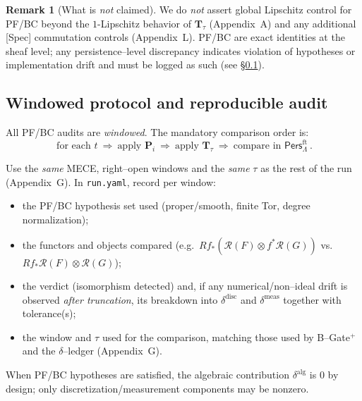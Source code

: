 \documentclass[11pt]{article}
\numberwithin{equation}{section}
\theoremstyle{plain}
\theoremstyle{definition}
\theoremstyle{remark}
\newcommand{\Pers}{\mathsf{Pers}}
\theoremstyle{plain}
\theoremstyle{definition}
\numberwithin{equation}{section}
\theoremstyle{definition}
\newtheorem{remark}[theorem]{Remark}
\numberwithin{equation}{section}
\theoremstyle{plain}
\theoremstyle{definition}
\theoremstyle{remark}
\begin{document}
\begin{remark}[What is \emph{not} claimed]
We do \emph{not} assert global Lipschitz control for PF/BC beyond the \(1\)\nobreakdash-Lipschitz behavior of \(\mathbf{T}_\tau\) (Appendix~A) and any additional [Spec] commutation controls (Appendix~L). PF/BC are exact identities at the sheaf level; any persistence--level discrepancy indicates violation of hypotheses or implementation drift and must be logged as such (see \S\ref{N:window-protocol}).
\end{remark}

\subsection{Windowed protocol and reproducible audit}
\label{N:window-protocol}
All PF/BC audits are \emph{windowed}. The mandatory comparison order is:
\[
\boxed{\ \text{for each } t\ \Longrightarrow\ \text{apply } \mathbf{P}_i\ \Longrightarrow\ \text{apply } \mathbf{T}_\tau\ \Longrightarrow\ \text{compare in }\Pers^{\mathrm{ft}}_\Lambda\ }.
\]

Use the \emph{same} MECE, right–open windows and the \emph{same} \(\tau\) as the rest of the run (Appendix~G). In \texttt{run.yaml}, record per window:
\begin{itemize}\itemsep0.25em
  \item the PF/BC hypothesis set used (proper/smooth, finite Tor, degree normalization);
  \item the functors and objects compared (e.g.\ \(Rf_\ast(\mathcal{R}(F)\otimes f^\ast\mathcal{R}(G))\) vs.\ \(Rf_\ast\mathcal{R}(F)\otimes\mathcal{R}(G)\));
  \item the verdict (isomorphism detected) and, if any numerical/non–ideal drift is observed \emph{after truncation}, its breakdown into \(\delta^{\mathrm{disc}}\) and \(\delta^{\mathrm{meas}}\) together with tolerance(s);
  \item the window and \(\tau\) used for the comparison, matching those used by B–Gate\(^{+}\) and the \(\delta\)–ledger (Appendix~G).
\end{itemize}
When PF/BC hypotheses are satisfied, the algebraic contribution \(\delta^{\mathrm{alg}}\) is \(0\) by design; only discretization/measurement components may be nonzero.

\end{document}
